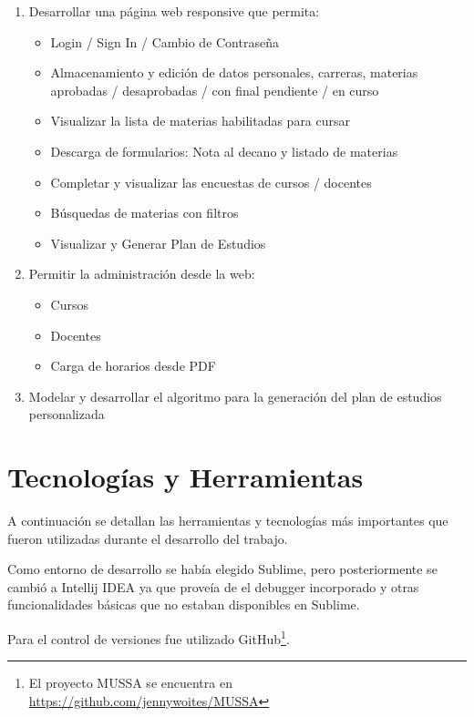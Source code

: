 \documentclass[a4paper]{article}
\begin{document}
\begin{enumerate}
	\item Desarrollar una página web responsive que permita:
		\begin{itemize}
			\item Login / Sign In / Cambio de Contraseña
			\item Almacenamiento y edición de datos personales, carreras, materias aprobadas / desaprobadas / con final pendiente / en curso
			\item Visualizar la lista de materias habilitadas para cursar
			\item Descarga de formularios: Nota al decano y listado de materias
			\item Completar y visualizar las encuestas de cursos / docentes
			\item Búsquedas de materias con filtros
			\item Visualizar y Generar Plan de Estudios
		\end{itemize}

	\item Permitir la administración desde la web:
		\begin{itemize}
			\item Cursos
			\item Docentes
			\item Carga de horarios desde PDF
		\end{itemize}
		
	\item Modelar y desarrollar el algoritmo para la generación del plan de estudios personalizada
\end{enumerate}

\section{Tecnologías y Herramientas}

A continuación se detallan las herramientas y tecnologías más importantes que fueron utilizadas durante el desarrollo del trabajo.\newline

Como entorno de desarrollo se había elegido Sublime, pero posteriormente se cambió a Intellij IDEA ya que proveía de el debugger incorporado y otras funcionalidades básicas que no estaban disponibles en Sublime.\newline

Para el control de versiones fue utilizado GitHub\footnote{El proyecto MUSSA se encuentra en \url{https://github.com/jennywoites/MUSSA}}.\newline
\end{document}
